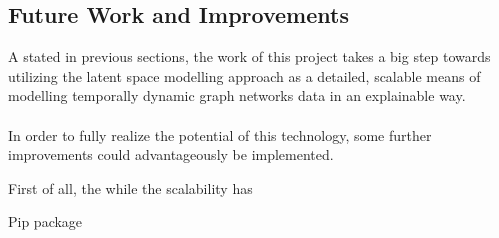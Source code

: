\subsection{Future Work and Improvements}
\label{sec:Discussion:FutureWork}
A stated in previous sections, the work of this project takes a big step towards utilizing the latent space modelling approach as a detailed, scalable means of modelling temporally dynamic graph networks data in an explainable way.
\\\\
In order to fully realize the potential of this technology, some further improvements could advantageously be implemented.



First of all, the while the scalability has





Pip package


